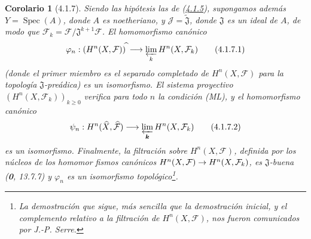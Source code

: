 \documentclass[10pt,oneside,openany]{book}
\theoremstyle{egaenv}\newtheorem*{env}{---}
\theoremstyle{egastatement}
\newtheorem*{corollary}{Corolario}
\theoremstyle{egadescription}
\newcommand{\oldpage}[2][]{\marginnote{\normalfont\scriptsize\textbf{#1}\,|\,#2}\ignorespaces}
\renewcommand{\geq}{\geqslant}
\renewcommand{\to}{\mathchoice{\longrightarrow}{\rightarrow}{\rightarrow}{\rightarrow}}
\begin{document}
\begin{corollary}[4.1.7]
\label{III.4.1.7-fr}
Siendo las hipótesis las de \textup{(\hyperref[III.4.1.5-fr]{4.1.5})}, supongamos
además $Y=\operatorname{Spec}(A)$, donde $A$ es noetheriano, y
$\mathcal J=\widetilde{\mathfrak J}$, donde $\mathfrak J$ es un ideal de
$A$, de modo que
$\mathcal F_k=\mathcal F/\mathfrak J^{k+1}\mathcal F$.
El homomorfismo canónico
\[
\varphi_n:(H^n(X,\mathcal F))^{\widehat{\,}}
\longrightarrow\varprojlim_kH^n(X,\mathcal F_k)
\tag{4.1.7.1}\label{III.4.1.7.1-fr}
\]
(donde el primer miembro es el separado completado de $H^n(X,\mathcal F)$ para
la topología $\mathfrak J$-preádica) es un isomorfismo. El sistema
proyectivo $(H^n(X,\mathcal F_k))_{k\geq0}$ verifica para todo $n$ la
condición \textup{(ML)}, y el homomorfismo canónico
\[
\psi_n:H^n(\widehat X,\widehat{\mathcal F})
\longrightarrow\varprojlim_{\boldsymbol{k}}H^n(X,\mathcal F_k)
\tag{4.1.7.2}\label{III.4.1.7.2-fr}
\]
es un isomorfismo. Finalmente, la filtración sobre $H^n(X,\mathcal F)$, definida
por los núcleos de los homomor%
\oldpage[III]{126}
fismos canónicos
$H^n(X,\mathcal F)\to H^n(X,\mathcal F_k)$, es $\mathfrak J$-buena
\textup{(\textbf{0}, 13.7.7)} y $\varphi_n$ es un isomorfismo topológico\footnote{La demostración que sigue, más sencilla que la demostración
inicial, y el complemento relativo a la filtración de
$H^n(X,\mathcal F)$, nos fueron comunicados por J.-P. Serre.}.
\end{corollary}
\end{document}
